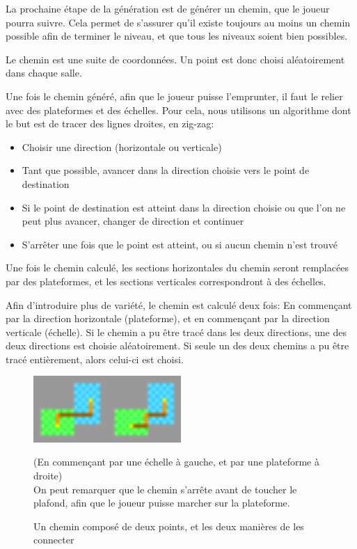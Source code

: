 \documentclass[10pt]{report}
\begin{document}
La prochaine étape de la génération est de générer un chemin, que le 
joueur pourra suivre. Cela permet de s'assurer qu'il existe toujours au
moins un chemin possible afin de terminer le niveau, et que tous les 
niveaux soient bien possibles.

Le chemin est une suite de coordonnées. Un point est donc choisi 
aléatoirement dans chaque salle.

Une fois le chemin généré, afin que le joueur puisse l'emprunter, il
faut le relier avec des plateformes et des échelles.
Pour cela, nous utilisons un algorithme dont le but est de tracer des
lignes droites, en zig-zag:

\begin{itemize}
  \item Choisir une direction (horizontale ou verticale)
  \item Tant que possible, avancer dans la direction choisie vers le
  point de destination
  \item Si le point de destination est atteint dans la direction choisie
  ou que l'on ne peut plus avancer, changer de direction et continuer
  \item S'arrêter une fois que le point est atteint, ou si aucun chemin 
  n'est trouvé
\end{itemize}

Une fois le chemin calculé, les sections horizontales du chemin seront
remplacées par des plateformes, et les sections verticales correspondront
à des échelles.

Afin d'introduire plus de variété, le chemin est calculé deux fois:
En commençant par la direction horizontale (plateforme), et en commençant
par la direction verticale (échelle). Si le chemin a pu être tracé dans
les deux directions, une des deux directions est choisie aléatoirement.
Si seule un des deux chemins a pu être tracé entièrement, alors celui-ci
est choisi.

\begin{figure}[H]
  \centering
  \includegraphics[width=0.5\textwidth]{images/two_ways_to_connect.png}
  \caption{Un chemin composé de deux points, et les deux manières de
  les connecter}
  (En commençant par une échelle à gauche, et par une plateforme à droite)\\
  On peut remarquer que le chemin s'arrête avant de toucher le plafond, 
  afin que le joueur puisse marcher sur la plateforme.
  \label{fig:two_ways_to_connect}
\end{figure}
\end{document}
